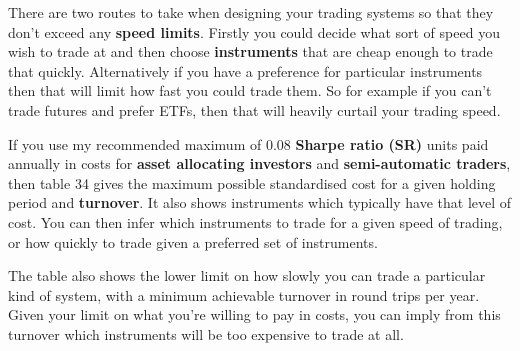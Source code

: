 There are two routes to take when designing your trading systems so that they don't exceed any \textbf{speed limits}. Firstly you could decide what sort of speed you wish to trade at and then choose \textbf{instruments} that are cheap enough to trade that quickly. Alternatively if you have a preference for particular instruments then that will limit how fast you could trade them. So for example if you can't trade futures and prefer ETFs, then that will heavily curtail your trading speed.

If you use my recommended maximum of 0.08 \textbf{Sharpe ratio (SR)} units paid annually in costs for \textbf{asset allocating investors} and \textbf{semi-automatic traders}, then table 34 gives the maximum possible standardised cost for a given holding period and \textbf{turnover}. It also shows instruments which typically have that level of cost. You can then infer which instruments to trade for a given speed of trading, or how quickly to trade given a preferred set of instruments.

The table also shows the lower limit on how slowly you can trade a particular kind of system, with a minimum achievable turnover in round trips per year. Given your limit on what you're willing to pay in costs, you can imply from this turnover which instruments will be too expensive to trade at all.

 


